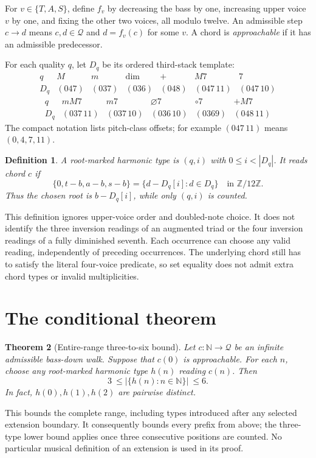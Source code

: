 \documentclass[11pt]{article}
\newtheorem{theorem}{Theorem}
\newtheorem{definition}[theorem]{Definition}
\newcommand{\Z}{\mathbb Z}
\newcommand{\N}{\mathbb N}
\newcommand{\Q}{\mathcal Q}
\begin{document}
For $v\in\{T,A,S\}$, define $f_v$ by decreasing the bass by one, increasing
upper voice $v$ by one, and fixing the other two voices, all modulo twelve.
An admissible step $c\longrightarrow d$ means $c,d\in\Q$ and $d=f_v(c)$ for
some $v$. A chord is \emph{approachable} if it has an admissible predecessor.

For each quality $q$, let $D_q$ be its ordered third-stack template:
\[
\begin{array}{c|cccccc}
q&M&m&\mathrm{dim}&+&M7&7\\\hline
D_q&(047)&(037)&(036)&(048)&(047\,11)&(047\,10)
\end{array}
\]
\[
\begin{array}{c|ccccc}
q&mM7&m7&\varnothing7&\circ7&+M7\\\hline
D_q&(037\,11)&(037\,10)&(036\,10)&(0369)&(048\,11)
\end{array}
\]
The compact notation lists pitch-class offsets; for example $(047\,11)$
means $(0,4,7,11)$.

\begin{definition}
A \emph{root-marked harmonic type} is $(q,i)$ with $0\leq i<|D_q|$.
It reads chord $c$ if
\[
\{0,t-b,a-b,s-b\}
 =\{d-D_q[i]:d\in D_q\}\quad\text{in }\Z/12\Z.
\]
Thus the chosen root is $b-D_q[i]$, while only $(q,i)$ is counted.
\end{definition}

This definition ignores upper-voice order and doubled-note choice. It does
not identify the three inversion readings of an augmented triad or the four
inversion readings of a fully diminished seventh. Each occurrence can choose
any valid reading, independently of preceding occurrences. The underlying
chord still has to satisfy the literal four-voice predicate, so set equality
does not admit extra chord types or invalid multiplicities.

\section{The conditional theorem}
\begin{theorem}[Entire-range three-to-six bound]\label{thm:main}
Let $c:\N\to\Q$ be an infinite admissible bass-down walk. Suppose that
$c(0)$ is approachable. For each $n$, choose any root-marked harmonic type
$h(n)$ reading $c(n)$. Then
\[
3\ \leq\bigl|\{h(n):n\in\N\}\bigr|\ \leq 6.
\]
In fact, $h(0),h(1),h(2)$ are pairwise distinct.
\end{theorem}

This bounds the complete range, including types introduced after any selected
extension boundary. It consequently bounds every prefix from above; the
three-type lower bound applies once three consecutive positions are counted.
No particular musical definition of an extension is used in its proof.
\end{document}
